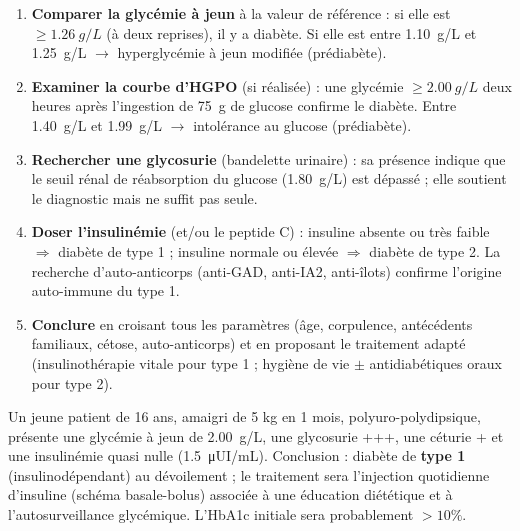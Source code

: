 \documentclass[11pt]{article}
\begin{document}
\begin{methode}
\begin{enumerate}
\item \textbf{Comparer la glycémie à jeun} à la valeur de référence : si elle est $\geq \SI{1,26}{g/L}$ (à deux reprises), il y a diabète. Si elle est entre \SI{1,10}{g/L} et \SI{1,25}{g/L} $\rightarrow$ hyperglycémie à jeun modifiée (prédiabète).
\item \textbf{Examiner la courbe d'HGPO} (si réalisée) : une glycémie $\geq \SI{2,00}{g/L}$ deux heures après l'ingestion de \SI{75}{g} de glucose confirme le diabète. Entre \SI{1,40}{g/L} et \SI{1,99}{g/L} $\rightarrow$ intolérance au glucose (prédiabète).
\item \textbf{Rechercher une glycosurie} (bandelette urinaire) : sa présence indique que le seuil rénal de réabsorption du glucose (\SI{1,80}{g/L}) est dépassé ; elle soutient le diagnostic mais ne suffit pas seule.
\item \textbf{Doser l'insulinémie} (et/ou le peptide C) : insuline absente ou très faible $\Rightarrow$ diabète de type 1 ; insuline normale ou élevée $\Rightarrow$ diabète de type 2. La recherche d'auto-anticorps (anti-GAD, anti-IA2, anti-îlots) confirme l'origine auto-immune du type 1.
\item \textbf{Conclure} en croisant tous les paramètres (âge, corpulence, antécédents familiaux, cétose, auto-anticorps) et en proposant le traitement adapté (insulinothérapie vitale pour type 1 ; hygiène de vie $\pm$ antidiabétiques oraux pour type 2).
\end{enumerate}
\end{methode}

\begin{exemplebox}
Un jeune patient de 16 ans, amaigri de 5 kg en 1 mois, polyuro-polydipsique, présente une glycémie à jeun de \SI{2,00}{g/L}, une glycosurie +++, une céturie + et une insulinémie quasi nulle (\SI{1,5}{\micro UI/mL}). Conclusion : diabète de \textbf{type 1} (insulinodépendant) au dévoilement ; le traitement sera l'injection quotidienne d'insuline (schéma basale-bolus) associée à une éducation diététique et à l'autosurveillance glycémique. L'HbA1c initiale sera probablement $> 10\%$.
\end{exemplebox}
\end{document}
